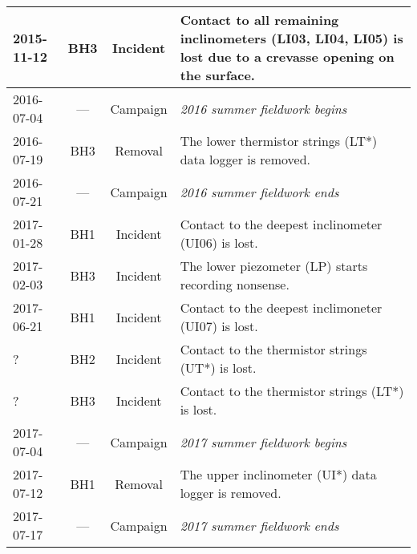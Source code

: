 \documentclass[utf8]{article}
\begin{document}
\begin{table}
{\begin{tabular}{lccp{95mm}}
        2015-11-12 & BH3  & Incident & Contact to all remaining inclinometers
                                       (LI03, LI04, LI05) is lost due to
                                       a crevasse opening on the surface. \\
        \hline
        2016-07-04 & ---  & Campaign & \emph{2016 summer fieldwork begins} \\
        2016-07-19 & BH3  & Removal  & The lower thermistor strings (LT*) data
                                       logger is removed. \\
        2016-07-21 & ---  & Campaign & \emph{2016 summer fieldwork ends} \\
        \hline
        2017-01-28 & BH1  & Incident & Contact to the deepest inclinometer
                                       (UI06) is lost. \\
        2017-02-03 & BH3  & Incident & The lower piezometer (LP) starts
                                       recording nonsense. \\
        2017-06-21 & BH1  & Incident & Contact to the deepest inclimoneter
                                       (UI07) is lost. \\
        ?          & BH2  & Incident & Contact to the thermistor strings (UT*)
                                       is lost. \\
        ?          & BH3  & Incident & Contact to the thermistor strings (LT*)
                                       is lost. \\
        \hline
        2017-07-04 & ---  & Campaign & \emph{2017 summer fieldwork begins} \\
        2017-07-12 & BH1  & Removal  & The upper inclinometer (UI*) data logger
                                       is removed. \\
        2017-07-17 & ---  & Campaign & \emph{2017 summer fieldwork ends} \\
        \hline
      \end{tabular}}
    \end{table}


\end{document}
